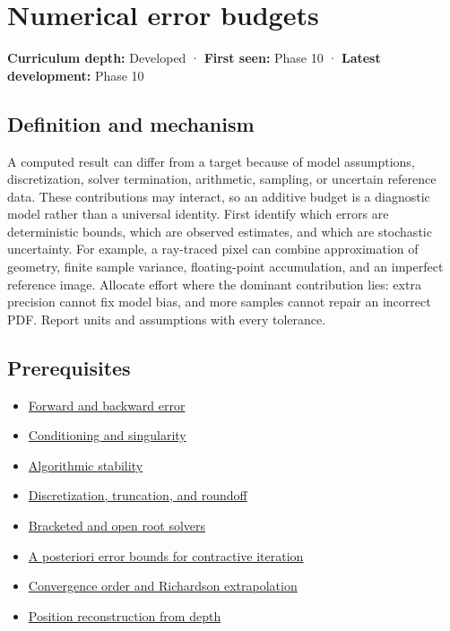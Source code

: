 \hypertarget{appendix-31b8c295e05f}{}\label{referencestart:appendix-31b8c295e05f}
\section{Numerical error budgets}\label{appendix-31b8c295e05f-numerical-error-budgets}

\textbf{Curriculum depth:} Developed · \textbf{First seen:} Phase 10 · \textbf{Latest development:} Phase 10

\subsection{Definition and mechanism}\label{appendix-31b8c295e05f-definition-and-mechanism}

A computed result can differ from a target because of model assumptions, discretization, solver termination, arithmetic, sampling, or uncertain reference data. These contributions may interact, so an additive budget is a diagnostic model rather than a universal identity. First identify which errors are deterministic bounds, which are observed estimates, and which are stochastic uncertainty. For example, a ray-traced pixel can combine approximation of geometry, finite sample variance, floating-point accumulation, and an imperfect reference image. Allocate effort where the dominant contribution lies: extra precision cannot fix model bias, and more samples cannot repair an incorrect PDF. Report units and assumptions with every tolerance.

\subsection{Prerequisites}\label{appendix-31b8c295e05f-prerequisites}

\begin{itemize}
\tightlist
\item
  \hyperref[appendix-a7fbaf6d1b1c]{Forward and backward error}
\item
  \hyperref[appendix-8f6a01f284a7]{Conditioning and singularity}
\item
  \hyperref[appendix-aa2bf0d79639]{Algorithmic stability}
\item
  \hyperref[appendix-6b0648b2b8e8]{Discretization, truncation, and roundoff}
\item
  \hyperref[appendix-f63eb850796d]{Bracketed and open root solvers}
\item
  \hyperref[appendix-d83b0ad1be7f]{A posteriori error bounds for contractive iteration}
\item
  \hyperref[appendix-aca80b6bf17a]{Convergence order and Richardson extrapolation}
\item
  \hyperref[appendix-2cbf2968e866]{Position reconstruction from depth}
\end{itemize}

